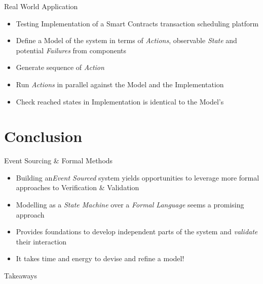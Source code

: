 \begin{frame}[fragile]{Real World Application}
  \begin{itemize}[<+->]
  \item Testing Implementation of a Smart Contracts transaction scheduling platform
  \item Define a Model of the system in terms of \emph{Actions}, observable \emph{State} and potential \emph{Failures} from components
  \item Generate sequence of \emph{Action}
  \item Run \emph{Actions} in parallel against the Model and the Implementation
  \item Check reached states in Implementation is identical to the Model's
  \end{itemize}
\end{frame}


\part{Conclusion}

\begin{frame}[fragile]{Event Sourcing \& Formal Methods}
  \begin{itemize}[<+->]
  \item Building an\emph{Event Sourced} system yields opportunities to leverage more formal approaches to Verification \& Validation
  \item Modelling as a \emph{State Machine} over a \emph{Formal Language} seems a promising approach
  \item Provides foundations to develop independent parts of the system and \emph{validate} their interaction
  \item It takes time and energy to devise and refine a model!
  \end{itemize}
\end{frame}

\begin{frame}[fragile]{Takeaways}
\end{frame}

